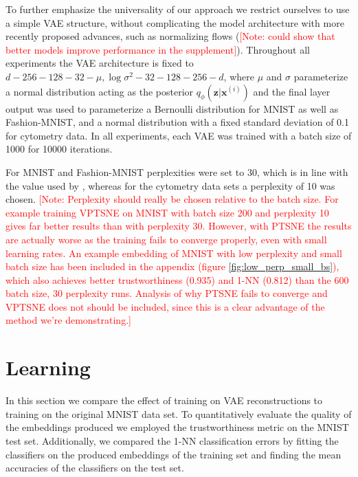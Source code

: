 To further emphasize the universality of our approach we restrict ourselves to use a simple VAE structure, without complicating the model architecture with more recently proposed advances, such as normalizing flows \citep{normalizing_flows} (\textcolor{red}{[Note: could show that better models improve performance in the supplement]}). Throughout all experiments the VAE architecture is fixed to $d - 256 - 128 - 32 - \mu, \log \sigma^2 - 32 - 128 - 256 - d$, where $\mu$ and $\sigma$ parameterize a normal distribution acting as the posterior $q_{\phi}(\mathbf{z} \vert \mathbf{x}^{(i)})$ and the final layer output was used to parameterize a Bernoulli distribution for MNIST as well as Fashion-MNIST, and a normal distribution with a fixed standard deviation of 0.1 for cytometry data. In all experiments, each VAE was trained with a batch size of 1000 for 10000 iterations.

For MNIST and Fashion-MNIST perplexities were set to 30, which is in line with the value used by \cite{parametric_tsne}, whereas for the cytometry data sets a perplexity of 10 was chosen. \textcolor{red}{[Note: Perplexity should really be chosen relative to the batch size. For example training VPTSNE on MNIST with batch size 200 and perplexity 10 gives far better results than with perplexity 30. However, with PTSNE the results are actually worse as the training fails to converge properly, even with small learning rates. An example embedding of MNIST with low perplexity and small batch size has been included in the appendix (figure \ref{fig:low_perp_small_bs}), which also achieves better trustworthiness (0.935) and 1-NN (0.812) than the 600 batch size, 30 perplexity runs. Analysis of why PTSNE fails to converge and VPTSNE does not should be included, since this is a clear advantage of the method we're demonstrating.]}

\section{Learning}
\label{subsection:learning}

In this section we compare the effect of training on VAE reconstructions to training on the original MNIST data set. To quantitatively evaluate the quality of the embeddings produced we employed the trustworthiness metric \citep{trustworthiness} on the MNIST test set. Additionally, we compared the 1-NN classification errors by fitting the classifiers on the produced embeddings of the training set and finding the mean accuracies of the classifiers on the test set.

